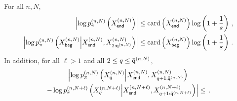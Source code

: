 \begin{lemma}
For all $n,N$,
\begin{align*}
\left|\log p_{\pi}^{(n,N)}\left(X_{\mathsf{end}}^{(n,N)}\right)\right|&\le \mathrm{card}\left(X_{\mathsf{end}}^{(n,N)}\right)\log \left(1+\frac{1}{\varepsilon}\right)\,,\\
\left|\log p_{\pi}^{(n,N)}\left(X_{\mathsf{beg}}^{(n,N)}\middle|X_{\mathsf{end}}^{(n,N)},X_{2:\bar{\mathsf{q}}^{(n,N)}}^{(n,N)}\right)\right|&\le \mathrm{card}\left(X_{\mathsf{beg}}^{(n,N)}\right)\log \left(1+\frac{1}{\varepsilon}\right)\,.
\end{align*}
In addition,  for all $\ell>1$ and all $2\le q\le \bar{\mathsf{q}}^{(n,N)}$,
\begin{multline*}
\left|\log p_{\pi}^{(n,N)}\left(X_{q}^{(n,N)}\middle|X_{\mathsf{end}}^{(n,N)},X_{q+1:\bar{\mathsf{q}}^{(n,N)}}^{(n,N)}\right) \right.\\
\left.- \log p_{\pi}^{(n,N+\ell)}\left(X_{q}^{(n,N+\ell)}\middle|X_{\mathsf{end}}^{(n,N+\ell)},X_{q+1:\bar{\mathsf{q}}^{(n,N+\ell)}}^{(n,N+\ell)}\right) \right|\leq\,.
\end{multline*}
\end{lemma}

